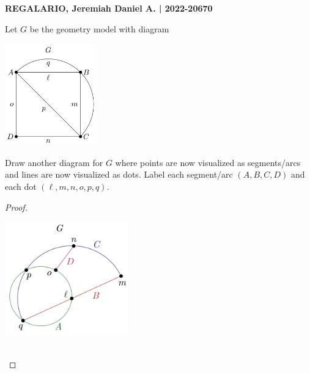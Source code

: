 \documentclass[a4paper, 10pt]{exam}
\begin{document}
\textbf{REGALARIO, Jeremiah Daniel A. | 2022-20670}
\begin{questions}
    \question Let $G$ be the geometry model with diagram
    \begin{center}
        \includegraphics[width=0.3\textwidth]{1.2.png}
    \end{center}
Draw another diagram for $G$ where points are now visualized as segments/arcs and lines are now visualized as dots. Label each segment/arc $ (A, B, C, D) $ and each dot $(\ell, m, n, o, p, q).$
    \begin{proof}
        \begin{center}
            \includegraphics[width=0.4\textwidth]{2.1.png}
        \end{center} 
        \\
    \end{proof}
   
\end{questions}
\end{document}
